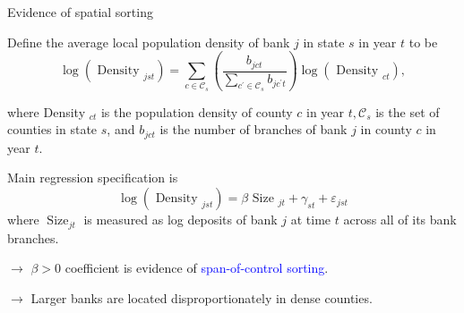\documentclass[notes,10pt, aspectratio=169]{beamer}
\newenvironment{wideitemize}{\itemize\addtolength{\itemsep}{10pt}}{\enditemize}
\begin{document}
\begin{frame}{Evidence of spatial sorting}

    \begin{wideitemize}
        \item Define the average local population density of bank $j$ in state $s$ in year $t$ to be
        $$
        \log \left(\text { Density }_{j s t}\right)=\sum_{c \in \mathcal{C}_s}\left(\frac{b_{j c t}}{\sum_{c^{\prime} \in \mathcal{C}_s} b_{j c^{\prime} t}}\right) \log \left(\text { Density }_{c t}\right),
        $$

        where Density ${ }_{c t}$ is the population density of county $c$ in year $t, \mathcal{C}_s$ is the set of counties in state $s$, and $b_{j c t}$ is the number of branches of bank $j$ in county $c$ in year $t$. %
        
        \item  Main regression specification is
$$
\log \left(\text { Density }_{j s t}\right)=\beta \text { Size }_{j t}+\gamma_{s t}+\varepsilon_{j s t}
$$
where $\operatorname{Size}_{j t}$ is measured as log deposits of bank $j$ at time $t$ across all of its bank branches. 

\item[$\rightarrow$] $\beta>0$ coefficient is evidence of \textcolor{blue}{span-of-control sorting}.

\item[$\rightarrow$] Larger banks are located disproportionately in dense counties.

    \end{wideitemize}
    \end{frame}
\end{document}
